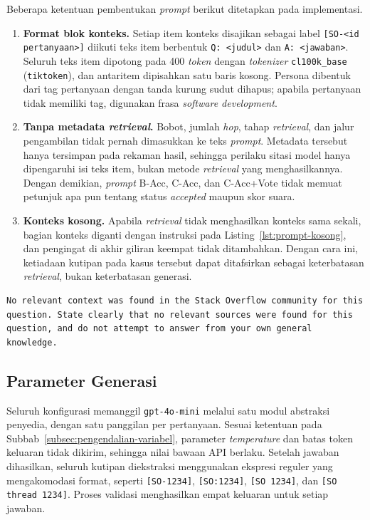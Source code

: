 Beberapa ketentuan pembentukan \emph{prompt} berikut ditetapkan pada implementasi.
\begin{enumerate}
    \item \textbf{Format blok konteks.} Setiap item konteks disajikan sebagai label \texttt{[SO-<id pertanyaan>]} diikuti teks item berbentuk \texttt{Q: <judul>} dan \texttt{A: <jawaban>}. Seluruh teks item dipotong pada 400 \emph{token} dengan \emph{tokenizer} \texttt{cl100k\_base} (\texttt{tiktoken}), dan antaritem dipisahkan satu baris kosong. Persona dibentuk dari tag pertanyaan dengan tanda kurung sudut dihapus; apabila pertanyaan tidak memiliki tag, digunakan frasa \emph{software development}.
    \item \textbf{Tanpa metadata \emph{retrieval}.} Bobot, jumlah \emph{hop}, tahap \emph{retrieval}, dan jalur pengambilan tidak pernah dimasukkan ke teks \emph{prompt}. Metadata tersebut hanya tersimpan pada rekaman hasil, sehingga perilaku sitasi model hanya dipengaruhi isi teks item, bukan metode \emph{retrieval} yang menghasilkannya. Dengan demikian, \emph{prompt} B-Acc, C-Acc, dan C-Acc+Vote tidak memuat petunjuk apa pun tentang status \emph{accepted} maupun skor suara.
    \item \textbf{Konteks kosong.} Apabila \emph{retrieval} tidak menghasilkan konteks sama sekali, bagian konteks diganti dengan instruksi pada Listing~\ref{lst:prompt-kosong}, dan pengingat di akhir giliran keempat tidak ditambahkan. Dengan cara ini, ketiadaan kutipan pada kasus tersebut dapat ditafsirkan sebagai keterbatasan \emph{retrieval}, bukan keterbatasan generasi.
\end{enumerate}

\begin{lstlisting}[caption={Pengganti blok konteks pada giliran keempat apabila \emph{retrieval} tidak menghasilkan konteks.}, label={lst:prompt-kosong}, frame=single, captionpos=t, language={}, basicstyle=\ttfamily\scriptsize]
No relevant context was found in the Stack Overflow community for this
question. State clearly that no relevant sources were found for this
question, and do not attempt to answer from your own general knowledge.
\end{lstlisting}

\subsection{Parameter Generasi}
\label{subsec:kutipan-generasi}

Seluruh konfigurasi memanggil \texttt{gpt-4o-mini} melalui satu modul abstraksi penyedia, dengan satu panggilan per pertanyaan. Sesuai ketentuan pada Subbab~\ref{subsec:pengendalian-variabel}, parameter \emph{temperature} dan batas token keluaran tidak dikirim, sehingga nilai bawaan API berlaku. Setelah jawaban dihasilkan, seluruh kutipan diekstraksi menggunakan ekspresi reguler yang mengakomodasi format, seperti \texttt{[SO-1234]}, \texttt{[SO:1234]}, \texttt{[SO 1234]}, dan \texttt{[SO thread 1234]}. Proses validasi menghasilkan empat keluaran untuk setiap jawaban.

